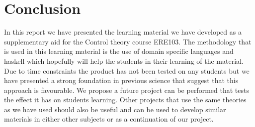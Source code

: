 \section{Conclusion}


In this report we have presented the learning material we have developed as a supplementary aid for the Control theory course ERE103. The methodology that is used in this learning material is the use of domain specific languages and haskell which hopefully will help the students in their learning of the material. Due to time constraints the product has not been tested on any students but we have presented a strong foundation in previous science that suggest that this approach is favourable. We propose a future project can be performed that tests the effect it has on students learning. Other projects that use the same theories as we have used should also be useful and can be used to develop similar materials in either other subjects or as a continuation of our project.
